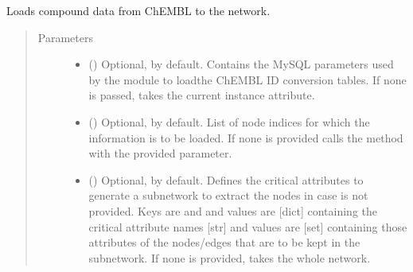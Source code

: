 \documentclass[letterpaper,10pt,english]{sphinxmanual}
\begin{document}
\begin{fulllineitems}

\begin{fulllineitems}
\label{\detokenize{main:pypath.main.PyPath.complexes_in_network}}
\end{fulllineitems}


\begin{fulllineitems}
\label{\detokenize{main:pypath.main.PyPath.compounds_from_chembl}}
Loads compound data from ChEMBL to the network.
\begin{quote}\begin{description}
\item[{Parameters}] \leavevmode\begin{itemize}
\item {} 
 () \textendash{} Optional,  by default. Contains the MySQL parameters
used by the  module to loadthe
ChEMBL ID conversion tables. If none is passed, takes the
current instance 
attribute.

\item {} 
 () \textendash{} Optional,  by default. List of node indices for
which the information is to be loaded. If none is provided
calls the method {\hyperref[\detokenize{main:pypath.main.PyPath.get_sub}]{}} with
the provided  parameter.

\item {} 
 () \textendash{} Optional,  by default. Defines the critical
attributes to generate a subnetwork to extract the nodes in
case  is not provided. Keys are  and
 and values are {[}dict{]} containing the critical
attribute names {[}str{]} and values are {[}set{]} containing those
attributes of the nodes/edges that are to be kept in the
subnetwork. If none is provided, takes the whole network.


\end{itemize}
\end{description}
\end{quote}
\end{fulllineitems}
\end{fulllineitems}
\end{document}
